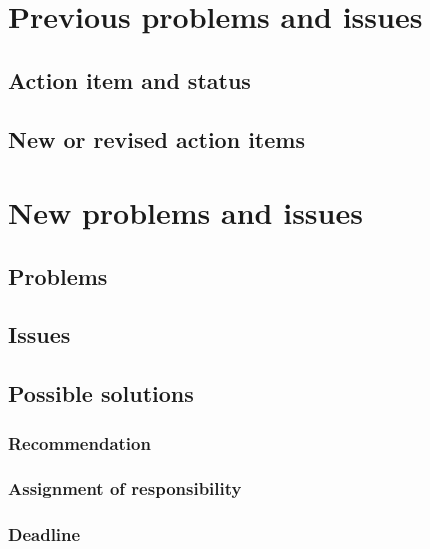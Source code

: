 \documentclass[a4paper, 12pt, onepage]{article}
\begin{document}
      \cleardoublepage
      \section{Previous problems and issues}
      \subsection{Action item and status} %
      \subsection{New or revised action items} %

      \cleardoublepage
      \section{New problems and issues}
      \subsection{Problems}
      \subsection{Issues}
      \subsection{Possible solutions}
      \subsubsection{Recommendation}
      \subsubsection{Assignment of responsibility}
      \subsubsection{Deadline}
\end{document}
